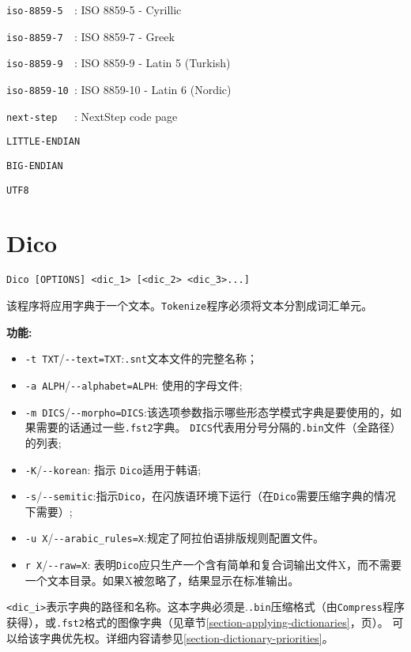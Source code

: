 \verb$iso-8859-5  $: ISO 8859-5  - Cyrillic

\verb$iso-8859-7  $: ISO 8859-7  - Greek

\verb$iso-8859-9  $: ISO 8859-9  - Latin 5 (Turkish)

\verb$iso-8859-10 $: ISO 8859-10 - Latin 6 (Nordic)

\verb$next-step   $: NextStep code page

\verb$LITTLE-ENDIAN$

\verb$BIG-ENDIAN$

\verb$UTF8$







\section{Dico}
\verb+Dico [OPTIONS] <dic_1> [<dic_2> <dic_3>...]+

\bigskip
\noindent 该程序将应用字典于一个文本。\verb+Tokenize+程序必须将文本分割成词汇单元。

\bigskip
\noindent \textbf{功能:}
\begin{itemize}
\item \verb+-t TXT+/\verb+--text=TXT+:\verb+.snt+文本文件的完整名称；
\item \verb+-a ALPH+/\verb+--alphabet=ALPH+: 使用的字母文件;
\item \verb+-m DICS+/\verb+--morpho=DICS+:该选项参数指示哪些形态学模式字典是要使用的，如果需要的话通过一些\verb+.fst2+字典。 \verb+DICS+代表用分号分隔的\verb+.bin+文件（全路径）的列表;
\item \verb+-K+/\verb+--korean+: 指示 \verb$Dico$适用于韩语;
\item \verb+-s+/\verb+--semitic+:指示\verb$Dico$，在闪族语环境下运行（在\verb$Dico$需要压缩字典的情况下需要）;
\item \verb+-u X+/\verb+--arabic_rules=X+:规定了阿拉伯语排版规则配置文件。
\item \verb+r X+/\verb+--raw=X+: 表明\verb$Dico$应只生产一个含有简单和复合词输出文件X，而不需要一个文本目录。如果X被忽略了，结果显示在标准输出。
\end{itemize}

\bigskip
\noindent \verb+<dic_i>+表示字典的路径和名称。这本字典必须是.\verb+.bin+压缩格式（由\verb+Compress+程序获得），或\verb+.fst2+格式的图像字典（见章节\ref{section-applying-dictionaries}，\pageref{section-applying-dictionaries}页）。	可以给该字典优先权。详细内容请参见\ref{section-dictionary-priorities}。

